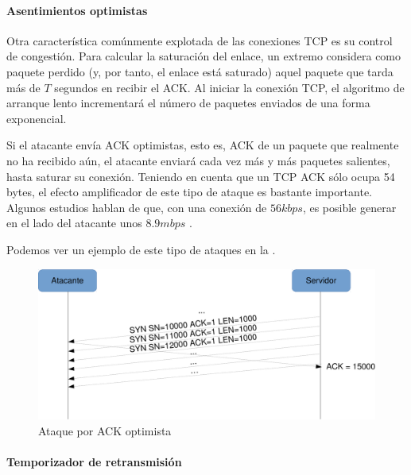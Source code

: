 \paragraph{Asentimientos optimistas}\mbox{\newline}

Otra característica comúnmente explotada de las conexiones \gls{TCP} es su control de congestión. Para calcular la saturación del enlace, un extremo considera como paquete perdido (y, por tanto, el 
enlace está saturado) aquel paquete que tarda más de $T$ segundos en recibir el ACK. Al iniciar la conexión \gls{TCP}, el 
algoritmo de arranque lento incrementará el número de paquetes enviados de una forma exponencial.

Si el atacante envía \gls{ACK} optimistas, esto es, \gls{ACK} de un paquete que realmente no ha recibido aún, el atacante enviará 
cada vez más y más paquetes salientes, hasta saturar su conexión. Teniendo en cuenta que un \gls{TCP} \gls{ACK} sólo ocupa 54 
bytes, el efecto amplificador de este tipo de ataque es bastante importante. Algunos estudios hablan de que, con una 
conexión de $56kbps$, es posible generar en el lado del atacante unos $8.9mbps$ \cite{sherwood}.

Podemos ver un ejemplo de este tipo de ataques en la .

\begin{figure}[htbp]
\centering
\includegraphics[width=\textwidth]{CapituloDDoS/Figuras/optim_ACK_attack}
\caption{Ataque por ACK optimista}
\end{figure}
%

\paragraph{Temporizador de retransmisión}\mbox{\newline}

